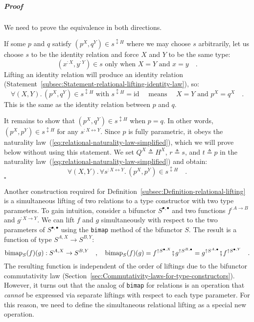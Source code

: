 \subparagraph{Proof}

We need to prove the equivalence in both directions.

If some $p$ and $q$ satisfy $(p^{X},q^{Y})\in s^{\updownarrow H}$
where we may choose $s$ arbitrarily, let us choose $s$ to be the
identity relation and force $X$ and $Y$ to be the same type:
\[
(x^{:X},y^{:Y})\in s\text{ only when }X=Y\text{ and }x=y\quad.
\]
Lifting an identity relation will produce an identity relation (Statement~\ref{subsec:Statement-relational-lifting-identity-law}),
so:
\[
\forall(X,Y).\,(p^{X},q^{Y})\in s^{\updownarrow H}\text{ with }s^{\updownarrow H}=\text{id}\quad\text{ means }\quad X=Y\text{ and }p^{X}=q^{X}\quad.
\]
This is the same as the identity relation between $p$ and $q$.

It remains to show that $(p^{X},q^{Y})\in s^{\updownarrow H}$ when
$p=q$. In other words, $(p^{X},p^{Y})\in s^{\updownarrow H}$ for
any $s^{:X\leftrightarrow Y}$. Since $p$ is fully parametric, it
obeys the naturality law~(\ref{eq:relational-naturality-law-simplified}),
which we will prove below without using this statement. We set $Q^{X}\triangleq H^{X}$,
$r\triangleq s$, and $t\triangleq p$ in the naturality law~(\ref{eq:relational-naturality-law-simplified})
and obtain:
\[
\forall(X,Y).\,\forall s^{:X\leftrightarrow Y}.\,(p^{X},p^{Y})\in s^{\updownarrow H}\quad.
\]
$\square$

Another construction required for Definition~\ref{subsec:Definition-relational-lifting}
is a simultaneous lifting of two relations to a type constructor with
two type parameters. To gain intuition, consider a bifunctor $S^{\bullet,\bullet}$
and two functions $f^{:A\rightarrow B}$ and $g^{:X\rightarrow Y}$.
We can lift $f$ and $g$ simultaneously with respect to the two parameters
of $S^{\bullet,\bullet}$ using the \lstinline!bimap! method of the
bifunctor $S$. The result is a function of type $S^{A,X}\rightarrow S^{B,Y}$:
\[
\text{bimap}_{S}(f)(g):S^{A,X}\rightarrow S^{B,Y}\quad,\quad\text{bimap}_{S}(f)(g)=f^{\uparrow S^{\bullet,X}}\bef g^{\uparrow S^{B,\bullet}}=g^{\uparrow S^{A,\bullet}}\bef f^{\uparrow S^{\bullet,Y}}\quad.
\]
The resulting function is independent of the order of liftings due
to the bifunctor commutativity law
(Section~\ref{sec:Commutativity-laws-for-type-constructors}). However,
it turns out that the analog of \lstinline!bimap! for relations is
an operation that \emph{cannot} be expressed via separate liftings
with respect to each type parameter. For this reason, we need to define
the simultaneous relational lifting as a special new operation.


